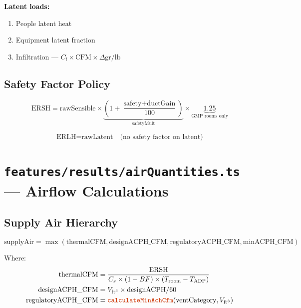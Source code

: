\documentclass[12pt, a4paper, oneside]{report}
\newcommand{\file}[1]{\texttt{\textcolor{codeblue}{#1}}}
\newcommand{\code}[1]{\texttt{\textcolor{codered}{#1}}}
\begin{document}
\textbf{Latent loads:}
\begin{enumerate}
  \item People latent heat
  \item Equipment latent fraction
  \item Infiltration --- $C_l \times \text{CFM} \times \Delta\text{gr/lb}$
\end{enumerate}

\subsection{Safety Factor Policy}

\begin{equation}
  \text{ERSH} = \text{rawSensible} \times \underbrace{\left(1 + \frac{\text{safety} + \text{ductGain}}{100}\right)}_{\text{safetyMult}} \times \underbrace{1.25}_{\text{GMP rooms only}}
\end{equation}

\begin{equation}
  \text{ERLH} = \text{rawLatent} \quad \text{(no safety factor on latent)}
\end{equation}

\section{\file{features/results/airQuantities.ts} --- Airflow Calculations}

\subsection{Supply Air Hierarchy}

\begin{equation}
  \text{supplyAir} = \max(\text{thermalCFM}, \text{designACPH\_CFM}, \text{regulatoryACPH\_CFM}, \text{minACPH\_CFM})
\end{equation}

Where:
\begin{align}
  \text{thermalCFM} &= \frac{\text{ERSH}}{C_s \times (1 - BF) \times (T_{\text{room}} - T_{\text{ADP}})} \\
  \text{designACPH\_CFM} &= V_{\text{ft}^3} \times \text{designACPH} / 60 \\
  \text{regulatoryACPH\_CFM} &= \code{calculateMinAchCfm}(\text{ventCategory}, V_{\text{ft}^3})
\end{align}
\end{document}

